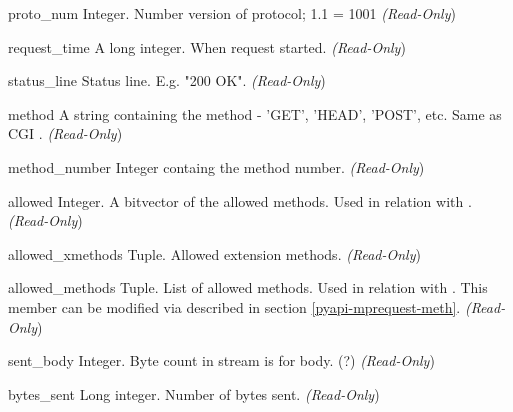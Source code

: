 \begin{memberdesc}[Request]{proto_num}
Integer. Number version of protocol; 1.1 = 1001 
\emph{(Read-Only})
\end{memberdesc}

\begin{memberdesc}[Request]{request_time}
A long integer. When request started.
\emph{(Read-Only})
\end{memberdesc}

\begin{memberdesc}[Request]{status_line}
Status line. E.g. "200 OK". 
\emph{(Read-Only})
\end{memberdesc}

\begin{memberdesc}[Request]{method}
A string containing the method - 'GET', 'HEAD', 'POST', etc.
Same as CGI .
\emph{(Read-Only})
\end{memberdesc}

\begin{memberdesc}[Request]{method_number}
Integer containg the method number.
\emph{(Read-Only})
\end{memberdesc}

\begin{memberdesc}[Request]{allowed}
Integer. A bitvector of the allowed methods. Used in relation with
.
\emph{(Read-Only})
\end{memberdesc}

\begin{memberdesc}[Request]{allowed_xmethods}
Tuple. Allowed extension methods.
\emph{(Read-Only})
\end{memberdesc}

\begin{memberdesc}[Request]{allowed_methods}
Tuple. List of allowed methods. Used in relation with
. This member can be modified via  
described in section \ref{pyapi-mprequest-meth}.
\emph{(Read-Only})
\end{memberdesc}

\begin{memberdesc}[Request]{sent_body}
Integer. Byte count in stream is for body. (?)
\emph{(Read-Only})
\end{memberdesc}

\begin{memberdesc}[Request]{bytes_sent}
Long integer. Number of bytes sent.
\emph{(Read-Only})
\end{memberdesc}

